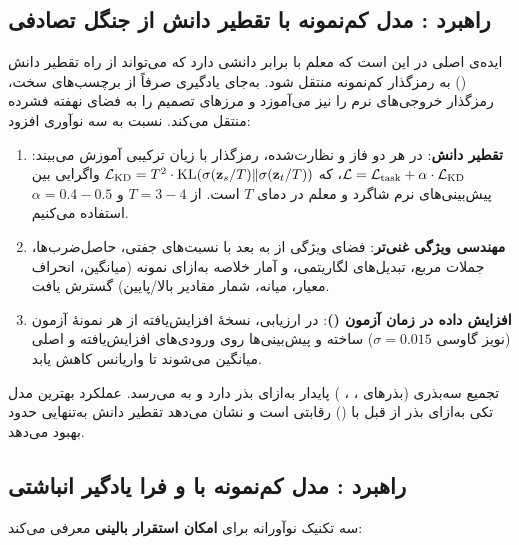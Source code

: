 \subsection{راهبرد : مدل کم‌نمونه  با تقطیر دانش از جنگل تصادفی}

ایده‌ی اصلی در  این است که معلم  با  برابر  دانشی دارد که می‌تواند از راه تقطیر دانش () به رمزگذار کم‌نمونه منتقل شود. به‌جای یادگیری صرفاً از برچسب‌های سخت، رمزگذار خروجی‌های نرم  را نیز می‌آموزد و مرزهای تصمیم  را به فضای نهفته فشرده منتقل می‌کند.  نسبت به  سه نوآوری افزود:

\begin{enumerate}
\item \textbf{تقطیر دانش}: در هر دو فاز  و نظارت‌شده، رمزگذار با زیان ترکیبی آموزش می‌بیند: $\mathcal{L} = \mathcal{L}_{\text{task}} + \alpha \cdot \mathcal{L}_{\text{KD}}$، که $\mathcal{L}_{\text{KD}} = T^2 \cdot \text{KL}(\sigma(\mathbf{z}_s/T) \| \sigma(\mathbf{z}_t/T))$ واگرایی  بین پیش‌بینی‌های نرم شاگرد و معلم در دمای $T$ است. از $T=3{-}4$ و $\alpha=0.4{-}0.5$ استفاده می‌کنیم.
\item \textbf{مهندسی ویژگی غنی‌تر}: فضای ویژگی از  به  بعد با نسبت‌های جفتی، حاصل‌ضرب‌ها، جملات مربع، تبدیل‌های لگاریتمی، و آمار خلاصه به‌ازای نمونه (میانگین، انحراف معیار، میانه، شمار مقادیر بالا/پایین) گسترش یافت.
\item \textbf{افزایش داده در زمان آزمون ()}: در ارزیابی،  نسخۀ افزایش‌یافته از هر نمونۀ آزمون (نویز گاوسی $\sigma=0.015$) ساخته و پیش‌بینی‌ها روی ورودی‌های افزایش‌یافته و اصلی میانگین می‌شوند تا واریانس کاهش یابد.
\end{enumerate}

تجمیع سه‌بذری (بذرهای ، ، )  پایدار به‌ازای بذر  دارد و  به  می‌رسد. عملکرد بهترین مدل تکی به‌ازای بذر از قبل با   () رقابتی است و نشان می‌دهد تقطیر دانش به‌تنهایی حدود  بهبود  می‌دهد.

\subsection{راهبرد : مدل کم‌نمونه  با  و فرا یادگیر انباشتی}
\label{sec:v4-strategy}

 سه تکنیک نوآورانه برای \textbf{امکان استقرار بالینی} معرفی می‌کند:

